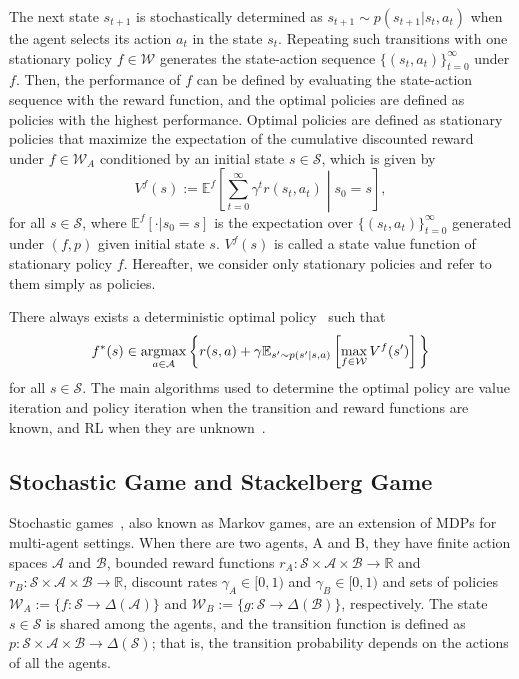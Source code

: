 \documentclass{acml}
\providecommand{\argmax}{\operatornamewithlimits{argmax}} %
\providecommand{\R}{\mathbb{R}} %
\providecommand{\E}{\mathbb{E}} %
\providecommand{\x}{\times}
\begin{document}
The next state $s_{t+1}$ is stochastically determined as $s_{t+1}\sim p(s_{t+1}|s_t,a_t)$ when the agent selects its action $a_t$ in the state $s_t$.
Repeating such transitions with one stationary policy $f\in\mathcal{W}$ generates the state-action sequence $\{(s_t,a_t)\}_{t=0}^{\infty}$ under $f$.
Then, the performance of $f$ can be defined by evaluating the state-action sequence with the reward function, and the optimal policies are defined as policies with the highest performance.
Optimal policies are defined as stationary policies that maximize the expectation of the cumulative discounted reward under $f\in\mathcal{W}_A$ conditioned by an initial state $s\in\mathcal{S}$, which is given by
\begin{equation*}
	V^{f}(s):=\E^{f}\left[\sum_{t=0}^{\infty} \gamma^tr(s_t,a_t)\middle| s_0=s\right],%
\end{equation*}
for all $s\in\mathcal{S}$, %
where $\E^{f}\left[\cdot|s_0=s\right]$ is the expectation over $\{(s_t,a_t)\}_{t=0}^{\infty}$ generated under $(f, p)$ given initial state $s$.
$V^{f}(s)$ is called a state value function of stationary policy $f$.
Hereafter, we consider only stationary policies and refer to them simply as policies.

There always exists a deterministic optimal policy~\citep{Sutton2018-jf} such that
\begin{equation}
	f^*(s) \in\argmax_{a\in\mathcal{A}} \bigg\{r(s,a) +\gamma\E_{s'\sim p(s'|s,a)}\left[\max_{f\in\mathcal{W}}V^{f}(s')\right]\bigg\}\label{eq:optPolicy_MDP}
\end{equation}%
for all $s\in\mathcal{S}$.
The main algorithms used to determine the optimal policy are value iteration and policy iteration when the transition and reward functions are known, and RL when they are unknown~\citep{Sutton2018-jf}.


\subsection{Stochastic Game and Stackelberg Game}

Stochastic games~\citep{Shapley1953-me,Solan2022-ce}, also known as Markov games, are an extension of MDPs for multi-agent settings. 
When there are two agents, A and B, they have finite action spaces $\mathcal{A}$ and $\mathcal{B}$, bounded reward functions $r_A: \mathcal{S}\x\mathcal{A}\x\mathcal{B}\to\R$ and $r_B: \mathcal{S}\x\mathcal{A}\x\mathcal{B}\to\R$, discount rates $\gamma_A\in[0,1)$ and $\gamma_B\in[0,1)$ and sets of policies $\mathcal{W}_A:=\{f:\mathcal{S}\to\Delta(\mathcal{A})\}$ and $\mathcal{W}_B:=\{g:\mathcal{S}\to\Delta(\mathcal{B})\}$, respectively.
The state $s\in\mathcal{S}$ is shared among the agents, and the transition function is defined as $p: \mathcal{S}\x\mathcal{A}\x\mathcal{B}\to\Delta(\mathcal{S})$; that is, the transition probability depends on the actions of all the agents.
\end{document}
